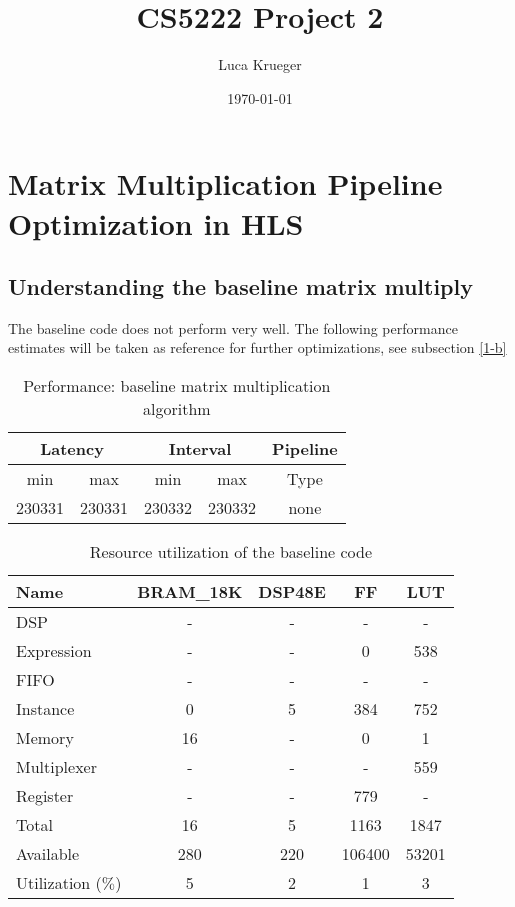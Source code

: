 \documentclass{article}
\title{CS5222 Project 2}
\author{Luca Krueger}
\date{\today}
\begin{document}
\maketitle

\section{Matrix Multiplication Pipeline Optimization in HLS}
\subsection{Understanding the baseline matrix multiply}

The baseline code does not perform very well. The following performance estimates will be taken as reference for further optimizations, see subsection \ref{1-b}
\begin{table}[H]
	\centering
	\begin{tabular}{ccccc}
		\multicolumn{2}{c}{Latency} & \multicolumn{2}{c}{Interval} & Pipeline\\
		\hline
		min  &   max  &   min  &   max  &   Type  \\
		230331&  230331&  230332&  230332&   none  
	\end{tabular}
	\caption{Performance: baseline matrix multiplication algorithm}
	\label{1-a-perf-table}
\end{table}

\begin{table}[H]
	\centering
	\begin{tabular}{lcccc}
		Name      & BRAM\_18K& DSP48E&   FF   &  LUT  \\
		\hline
		DSP              &        -&      -&       -&      -\\
		Expression       &        -&      -&       0&    538\\
		FIFO             &        -&      -&       -&      -\\
		Instance         &        0&      5&     384&    752\\
		Memory           &       16&      -&       0&      1\\
		Multiplexer      &        -&      -&       -&    559\\
		Register         &        -&      -&     779&      -\\
		\hline
		Total            &       16&      5&    1163&   1847\\
		Available        &      280&    220&  106400&  53201\\
		\hline
		Utilization ($\%$)  &        5&      2&       1&      3
	\end{tabular}
	\caption{Resource utilization of the baseline code}
	\label{1-a-resources}
\end{table}
\end{document}
